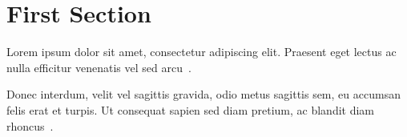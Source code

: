 \par\section{First Section}
\par\noindent Lorem ipsum dolor sit amet, consectetur adipiscing elit. Praesent eget lectus ac nulla efficitur venenatis vel sed arcu~\cite{IEEEexample:article_typical}.
\par\noindent Donec interdum, velit vel sagittis gravida, odio metus sagittis sem, eu accumsan felis erat et turpis. Ut consequat sapien sed diam pretium, ac blandit diam rhoncus~\cite{IEEEexample:articledualmonths,IEEEexample:articleetal,IEEEexample:articlelargepages,IEEEexample:babel,IEEEexample:beebe_archive}.